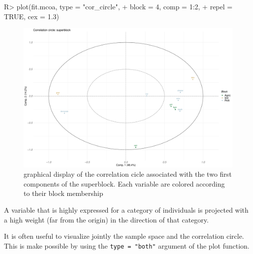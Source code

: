 \documentclass[
]{jss}
\begin{document}
\begin{CodeChunk}
\begin{CodeInput}
R> plot(fit.mcoa, type = "cor_circle",
+      block = 4, comp = 1:2, 
+      repel = TRUE, cex = 1.3)
\end{CodeInput}
\begin{figure}

{\centering \includegraphics{RGCCA_files/figure-latex/unnamed-chunk-15-1} 

}

\caption[graphical display of the correlation cicle associated with the two first components of the superblock]{graphical display of the correlation cicle associated with the two first components of the superblock. Each variable are colored according to their block membership}\label{fig:unnamed-chunk-15}
\end{figure}
\end{CodeChunk}

\normalsize

A variable that is highly expressed for a category of individuals is
projected with a high weight (far from the origin) in the direction of
that category.

It is often useful to visualize jointly the sample space and the
correlation circle. This is make possible by using the
\texttt{type\ =\ "both"} argument of the plot function.

\footnotesize
\end{document}
